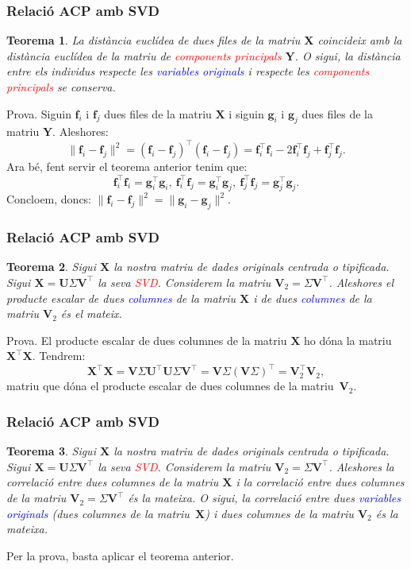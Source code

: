 \documentclass[12pt,t]{beamer}
\newcommand{\red}[1]{\textcolor{red}{#1}}
\newcommand{\blue}[1]{\textcolor{blue}{#1}}
\theoremstyle{plain}
\newtheorem{teorema}{Teorema}
\theoremstyle{definition}
\begin{document}
\begin{frame}
\frametitle{Relació ACP amb SVD}
\begin{teorema}
La distància euclídea de dues files de la matriu $\mathbf{X}$ coincideix amb la distància euclídea de la matriu de 
\red{components principals} $\mathbf{Y}$. O sigui, la distància entre els individus respecte les \blue{variables 
originals} i respecte les \red{components principals} se conserva.
\end{teorema}
{\footnotesize Prova. Siguin $\mathbf{f}_i$ i $\mathbf{f}_j$ dues files de la matriu $\mathbf{X}$ i siguin 
$\mathbf{g}_i$ i $\mathbf{g}_j$ dues files de la matriu $\mathbf{Y}$. Aleshores:
\[
\|\mathbf{f}_i-\mathbf{f}_j\|^2 = (\mathbf{f}_i-\mathbf{f}_j)^\top 
(\mathbf{f}_i-\mathbf{f}_j)=\mathbf{f}_i^\top\mathbf{f}_i-2\mathbf{f}_i^\top\mathbf{f}_j+\mathbf{f}_j^\top\mathbf{f}_j.
\]
Ara bé, fent servir el teorema anterior tenim que:
\[
\mathbf{f}_i^\top\mathbf{f}_i=\mathbf{g}_i^\top\mathbf{g}_i,\ 
\mathbf{f}_i^\top\mathbf{f}_j=\mathbf{g}_i^\top\mathbf{g}_j, \ 
\mathbf{f}_j^\top\mathbf{f}_j=\mathbf{g}_j^\top\mathbf{g}_j.
\]
Concloem, doncs:
\(
\|\mathbf{f}_i-\mathbf{f}_j\|^2=\|\mathbf{g}_i-\mathbf{g}_j\|^2.
\)
}
\end{frame}


\begin{frame}
\frametitle{Relació ACP amb SVD}
\begin{teorema}
Sigui $\mathbf{X}$ la nostra matriu de dades originals centrada o tipificada. Sigui 
$\mathbf{X}=\mathbf{U}\Sigma\mathbf{V}^\top$ la seva \red{SVD}. Considerem la matriu $\mathbf{V}_2 = 
\Sigma\mathbf{V}^\top$. Aleshores el producte escalar de dues \blue{columnes} de la matriu $\mathbf{X}$ i de dues 
\blue{columnes} de la matriu $\mathbf{V}_2$ és el mateix.
\end{teorema}
{\footnotesize Prova.
El producte escalar de dues columnes de la matriu $\mathbf{X}$ ho dóna la matriu $\mathbf{X}^\top\mathbf{X}$. Tendrem:
\[
\mathbf{X}^\top\mathbf{X}=\mathbf{V}\Sigma\mathbf{U}^\top\mathbf{U}\Sigma\mathbf{V}^\top = \mathbf{V}\Sigma 
(\mathbf{V}\Sigma)^\top = \mathbf{V}_2^\top\mathbf{V}_2,
\]
matriu que dóna el producte escalar de dues columnes de la matriu~$\mathbf{V}_2$.
}
\end{frame}


\begin{frame}
\frametitle{Relació ACP amb SVD}
\begin{teorema}
Sigui $\mathbf{X}$ la nostra matriu de dades originals centrada o tipificada. Sigui 
$\mathbf{X}=\mathbf{U}\Sigma\mathbf{V}^\top$ la seva \red{SVD}. Considerem la matriu $\mathbf{V}_2 = 
\Sigma\mathbf{V}^\top$. Aleshores la correlació entre dues columnes de la matriu $\mathbf{X}$ i la correlació entre dues 
columnes de la matriu $\mathbf{V}_2 = \Sigma\mathbf{V}^\top$ és la mateixa.
O sigui, la correlació entre dues \blue{variables originals} (dues columnes de la matriu~$\mathbf{X}$) i dues columnes 
de la matriu $\mathbf{V}_2$ és la mateixa.
\end{teorema}

Per la prova, basta aplicar el teorema anterior. 
\end{frame}
\end{document}
